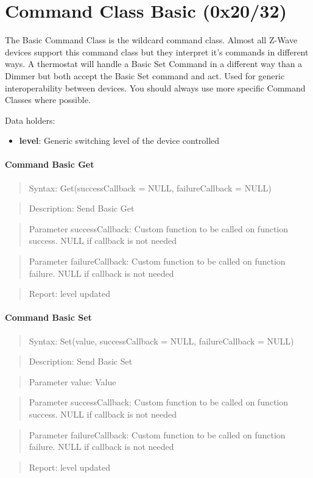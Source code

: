 

\section{Command Class Basic (0x20/32)}

The Basic Command Class is the wildcard command class. Almost all Z-Wave devices support this command class but they interpret it's commands in different ways. A thermostat will handle a Basic Set Command in a different way than a Dimmer but both accept the Basic Set command and act. Used for generic interoperability between devices. You should always use more specific Command Classes where possible.
\newline

\noindent
Data holders:

\begin{itemize}
\item \textbf{level}: Generic switching level of the device controlled
\end{itemize}

\paragraph{Command Basic Get}
\begin{quote}Syntax: Get(successCallback = NULL, failureCallback = NULL)\end{quote}
\begin{quote}Description: Send Basic Get\end{quote}
\begin{quote}Parameter successCallback: Custom function to be called on function success. NULL if callback is not needed\end{quote}
\begin{quote}Parameter failureCallback: Custom function to be called on function failure. NULL if callback is not needed\end{quote}
\begin{quote}Report: level updated\end{quote}

\paragraph{Command Basic Set}
\begin{quote}Syntax: Set(value, successCallback = NULL, failureCallback = NULL)\end{quote}
\begin{quote}Description: Send Basic Set\end{quote}
\begin{quote}Parameter value: Value\end{quote}
\begin{quote}Parameter successCallback: Custom function to be called on function success. NULL if callback is not needed\end{quote}
\begin{quote}Parameter failureCallback: Custom function to be called on function failure. NULL if callback is not needed\end{quote}
\begin{quote}Report: level updated\end{quote}


